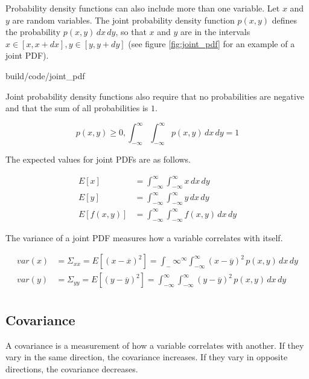 Probability density functions can also include more than one variable. Let $x$
and $y$ are random variables. The joint probability density function $p(x, y)$
defines the probability $p(x, y) \,dx \,dy$, so that $x$ and $y$ are in the
intervals $x \in [x, x + dx], y \in [y, y + dy]$ (see figure
\ref{fig:joint_pdf} for an example of a joint PDF).

\begin{svg}{build/code/joint_pdf}
  \caption{Joint probability density function}
  \label{fig:joint_pdf}
\end{svg}

Joint probability density functions also require that no probabilities are
negative and that the sum of all probabilities is $1$.

\begin{equation*}
  p(x, y) \geq 0, \int_{-\infty}^\infty \int_{-\infty}^{\infty} p(x, y) \,dx
    \,dy = 1
\end{equation*}

The expected values for joint PDFs are as follows.

\begin{align*}
  E[x] &= \int_{-\infty}^\infty \int_{-\infty}^{\infty} x \,dx \,dy \\
  E[y] &= \int_{-\infty}^\infty \int_{-\infty}^{\infty} y \,dx \,dy \\
  E[f(x, y)] &= \int_{-\infty}^\infty \int_{-\infty}^{\infty} f(x, y) \,dx \,dy
\end{align*}

The variance of a joint PDF measures how a variable correlates with itself.

\begin{align*}
  var(x) &= \Sigma_{xx} = E[(x - \overline{x})^2] =
    \int_-\infty^{\infty} \int_{-\infty}^\infty (x - \overline{y})^2 \,p(x, y)
    \,dx \,dy \\
  var(y) &= \Sigma_{yy} = E[(y - \overline{y})^2] =
    \int_{-\infty}^\infty \int_{-\infty}^\infty (y - \overline{y})^2 \,p(x, y)
    \,dx \,dy \\
\end{align*}

\subsection{Covariance}

A covariance is a measurement of how a variable correlates with another. If they
vary in the same direction, the covariance increases. If they vary in opposite
directions, the covariance decreases.

